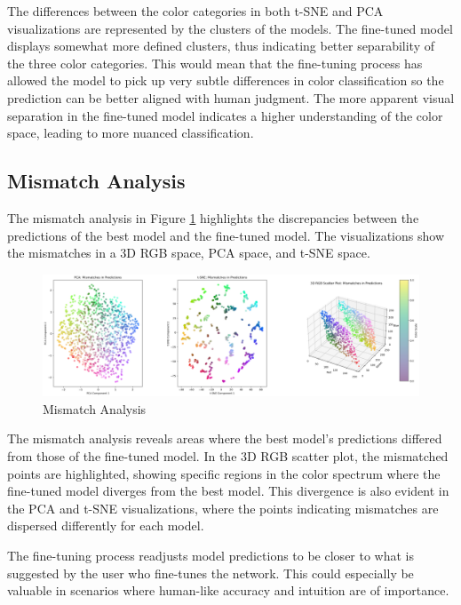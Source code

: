 \documentclass{article}
\begin{document}
The differences between the color categories in both t-SNE and PCA visualizations are represented by the clusters of the models. The fine-tuned model displays somewhat more defined clusters, thus indicating better separability of the three color categories. This would mean that the fine-tuning process has allowed the model to pick up very subtle differences in color classification so the prediction can be better aligned with human judgment. The more apparent visual separation in the fine-tuned model indicates a higher understanding of the color space, leading to more nuanced classification.

\subsection{Mismatch Analysis}
The mismatch analysis in Figure \ref{fig:mismatch_analysis} highlights the discrepancies between the predictions of the best model and the fine-tuned model. The visualizations show the mismatches in a 3D RGB space, PCA space, and t-SNE space.

\begin{figure}[H]
  \centering
    \includegraphics[width=\textwidth]{pictures/graph_4_comp.png}
    \caption{Mismatch Analysis}
    \label{fig:mismatch_analysis}
\end{figure}

The mismatch analysis reveals areas where the best model's predictions differed from those of the fine-tuned model. In the 3D RGB scatter plot, the mismatched points are highlighted, showing specific regions in the color spectrum where the fine-tuned model diverges from the best model. This divergence is also evident in the PCA and t-SNE visualizations, where the points indicating mismatches are dispersed differently for each model.

The fine-tuning process readjusts model predictions to be closer to what is suggested by the user who fine-tunes the network. This could especially be valuable in scenarios where human-like accuracy and intuition are of importance.
\end{document}
